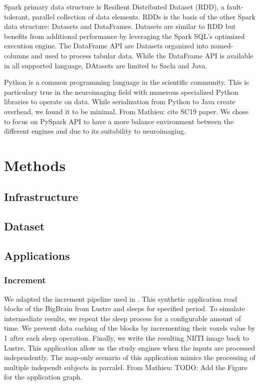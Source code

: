 \documentclass[conference]{IEEEtran}
\newcommand{\MD}[1]{\color{magenta}From Mathieu: #1 \color{black}}
\begin{document}
Spark primary data structure is Resilient Distributed Dataset (RDD)\cite{RDD}, a fault-tolerant, parallel collection of data elements.
RDDs is the basis of the other Spark data structure: Datasets and DataFrames.
Datasets are similar to RDD but benefits from additional performance by leveraging the Spark SQL's optimized execution engine.
The DataFrame API are Datasets organized into named-columns and used to process tabular data.
While the DataFrame API is available in all supported language, DAtasets are limited to Sacla and Java.

Python is a common programming language in the scientific community.
This is particulary true in the neuroimaging field with numerous specialized Python libraries to operate on data.
While serialization from Python to Java create overhead, we found it to be minimal. \MD{cite SC19 paper.}
We chose to focus on PySpark API to have a more balance environment between the different engines and due to its suitability to neuroimaging.

\section{Methods}
\subsection{Infrastructure} %
\subsection{Dataset} %

\subsection{Applications}
\subsubsection{Increment}
We adapted the increment pipeline used in \cite{hayot2019performance}.
This synthetic application read blocks of the BigBrain from Lustre and sleeps for specified period.
To simulate intermediate results, we repeat the sleep process for a configurable amount of time.
We prevent data caching of the blocks by incrementing their voxels value by 1 after each sleep operation.
Finally, we write the resulting NIfTI image back to Lustre.
This application allow us the study engines when the inputs are processed independently.
The map-only scenario of this application mimics the processing of multiple independt subjects in parralel.
\MD{TODO: Add the Figure for the application graph.}
\end{document}
